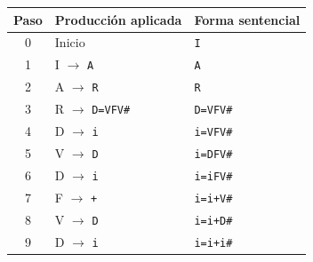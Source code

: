 \begin{tabular}{|c|l|l|}\hline
\rowcolor{cabecera}\textbf{Paso}&\textbf{Producción aplicada}&\textbf{Forma sentencial}\\\hline
0 & Inicio & \texttt{I} \\
1 & I $\to$ \texttt{A} & \texttt{A} \\
2 & A $\to$ \texttt{R} & \texttt{R} \\
3 & R $\to$ \texttt{D=VFV\#} & \texttt{D=VFV\#} \\
4 & D $\to$ \texttt{i} & \texttt{i=VFV\#} \\
5 & V $\to$ \texttt{D} & \texttt{i=DFV\#} \\
6 & D $\to$ \texttt{i} & \texttt{i=iFV\#} \\
7 & F $\to$ \texttt{+} & \texttt{i=i+V\#} \\
8 & V $\to$ \texttt{D} & \texttt{i=i+D\#} \\
9 & D $\to$ \texttt{i} & \texttt{i=i+i\#} \\
\hline\end{tabular}
